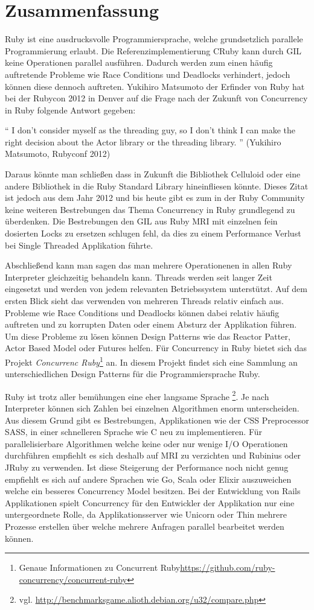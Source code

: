 \section{Zusammenfassung}
Ruby ist eine ausdrucksvolle Programmiersprache, welche grundsetzlich parallele Programmierung erlaubt. Die Referenzimplementierung CRuby kann durch GIL keine Operationen parallel ausführen. Dadurch werden zum einen häufig auftretende Probleme wie Race Conditions und Deadlocks verhindert, jedoch können diese dennoch auftreten. Yukihiro Matsumoto der Erfinder von Ruby hat bei der Rubycon 2012 in Denver auf die Frage nach der Zukunft von Concurrency in Ruby folgende Antwort gegeben:

	``
	I don't consider myself as the threading guy, so I don't think I can make the right decision about the Actor library or the threading library.
	'' (Yukihiro Matsumoto, Rubyconf 2012)

Daraus könnte man schließen dass in Zukunft die Bibliothek Celluloid oder eine andere Bibliothek in die Ruby Standard Library hineinfliesen könnte. Dieses Zitat ist jedoch aus dem Jahr 2012 und bis heute gibt es zum in der Ruby Community keine weiteren Bestrebungen das Thema Concurrency in Ruby grundlegend zu überdenken. Die Bestrebungen den GIL aus Ruby MRI mit einzelnen fein dosierten Locks zu ersetzen schlugen fehl, da dies zu einem Performance Verlust bei Single Threaded Applikation führte. 

Abschließend kann man sagen das man mehrere Operationenen in allen Ruby Interpreter gleichzeitig behandeln kann. Threads werden seit langer Zeit eingesetzt und werden von jedem relevanten Betriebssystem unterstützt. Auf dem ersten Blick sieht das verwenden von mehreren Threads relativ einfach aus. Probleme wie Race Conditions und Deadlocks können dabei relativ häufig auftreten und zu korrupten Daten oder einem Absturz der Applikation führen. Um diese Probleme zu lösen können Design Patterns wie das Reactor Patter, Actor Based Model oder Futures helfen. Für Concurrency in Ruby bietet sich das Projekt \emph{Concurrenc Ruby}\footnote{Genaue Informationen zu Concurrent Ruby\url{https://github.com/ruby-concurrency/concurrent-ruby}} an. In diesem Projekt findet sich eine Sammlung an unterschiedlichen Design Patterns für die Programmiersprache Ruby.

Ruby ist trotz aller bemühungen eine eher langsame Sprache \footnote{vgl. \url{http://benchmarksgame.alioth.debian.org/u32/compare.php}}. Je nach Interpreter können sich Zahlen bei einzelnen Algorithmen enorm unterscheiden. Aus diesem Grund gibt es Bestrebungen, Applikationen wie der CSS Preprocessor SASS, in einer schnelleren Sprache wie C neu zu implementieren. Für parallelisierbare Algorithmen welche keine oder nur wenige I/O Operationen durchführen empfiehlt es sich deshalb auf MRI zu verzichten und Rubinius oder JRuby zu verwenden. Ist diese Steigerung der Performance noch nicht genug empfiehlt es sich auf andere Sprachen wie Go, Scala oder Elixir auszuweichen welche ein besseres Concurrency Model besitzen. Bei der Entwicklung von Rails Applikationen spielt Concurrency für den Entwickler der Applikation nur eine untergeordnete Rolle, da Applikationsserver wie Unicorn oder Thin mehrere Prozesse erstellen über welche mehrere Anfragen parallel bearbeitet werden können. 
